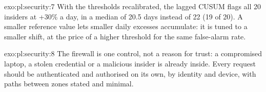 \begin{solution}{exo:pl:security:7}
With the thresholds recalibrated, the lagged CUSUM flags all 20 insiders at +30\% a day, in a median of 20.5 days instead of 22 (19 of 20). A
smaller reference value lets smaller daily excesses accumulate: it is tuned to a smaller shift, at the price of a higher threshold for the same
false-alarm rate.
\end{solution}

\begin{solution}{exo:pl:security:8}
The firewall is one control, not a reason for trust: a compromised laptop, a stolen credential or a malicious insider is already inside. Every
request should be authenticated and authorised on its own, by identity and device, with paths between zones stated and minimal.
\end{solution}


